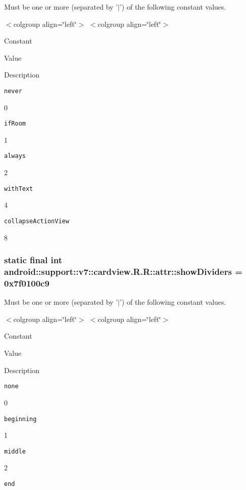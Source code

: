 Must be one or more (separated by '$|$') of the following constant values. \begin{TabularC}{0}
\hline
\end{TabularC}
$<$colgroup align=\char`\"{}left\char`\"{}$>$ $<$colgroup align=\char`\"{}left\char`\"{}$>$ 

Constant

Value

Description 

{\tt never}

0

{\tt ifRoom}

1

{\tt always}

2

{\tt withText}

4

{\tt collapseActionView}

8\hypertarget{classandroid_1_1support_1_1v7_1_1cardview_1_1_r_1_1attr_67850cb428017778b7f9bb9d48ab1628}{
\subsubsection[{showDividers}]{\setlength{\rightskip}{0pt plus 5cm}static final int android::support::v7::cardview.R.R::attr::showDividers = 0x7f0100c9}}
\label{classandroid_1_1support_1_1v7_1_1cardview_1_1_r_1_1attr_67850cb428017778b7f9bb9d48ab1628}


Must be one or more (separated by '$|$') of the following constant values. \begin{TabularC}{0}
\hline
\end{TabularC}
$<$colgroup align=\char`\"{}left\char`\"{}$>$ $<$colgroup align=\char`\"{}left\char`\"{}$>$ 

Constant

Value

Description 

{\tt none}

0

{\tt beginning}

1

{\tt middle}

2

{\tt end}

